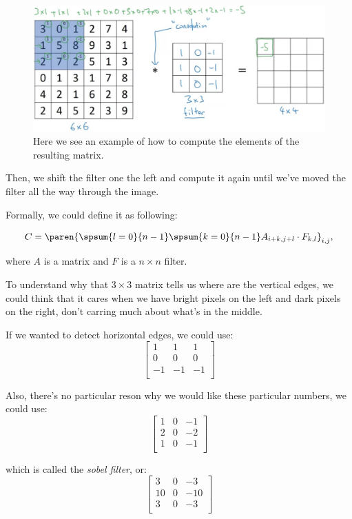 \documentclass[12pt, a4paper, oneside]{book}
\begin{document}
\begin{figure}[h]
\centering
\includegraphics[scale=0.3]{Res/convolution-computation.png}
\caption{Here we see an example of how to compute the elements of the resulting
matrix.}
\label{convolution-computation.png}
\end{figure}

Then, we shift the filter one the left and compute it again until we've moved
the filter all the way through the image.

Formally, we could define it as following:

\[
    C = \paren{\spsum{l=0}{n-1}\spsum{k=0}{n-1}A_{i+k,j+l}\cdot F_{k,l}}_{i,j},
\]


where $A$ is a matrix and $F$ is a $n\times n$ filter. \jump

To understand why that $3\times 3$ matrix tells us where are the vertical edges,
we could think that it cares when we have bright pixels on the left and dark
pixels on the right, don't carring much about what's in the middle.

If we wanted to detect horizontal edges, we could use:
\[
\begin{bmatrix}
    1 & 1 & 1 \\
    0 & 0 & 0 \\
    -1 & -1 & -1 \\
\end{bmatrix}
\]

Also, there's no particular reson why we would like these particular numbers, we
could use:
\[
\begin{bmatrix}
    1 & 0 & -1 \\
    2 & 0 & -2 \\
    1 & 0 & -1 \\
\end{bmatrix}
\]

which is called the \textit{sobel filter}, or:
\[
\begin{bmatrix}
    3 & 0 & -3 \\
    10 & 0 & -10 \\
    3 & 0 & -3 \\
\end{bmatrix}
\]
\end{document}
